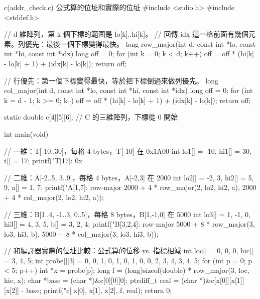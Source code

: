\begin{example}[label=ex:arr-addr]{c}{(addr\_check.c) 公式算的位址和實際的位址}
#include <stdio.h>
#include <stddef.h>

// d 維陣列，第 k 個下標的範圍是 lo[k]..hi[k]。
// 回傳 idx 這一格前面有幾個元素。列優先：最後一個下標變得最快。
long row_major(int d, const int *lo, const int *hi, const int *idx)
{
    long off = 0;
    for (int k = 0; k < d; k++)
        off = off * (hi[k] - lo[k] + 1) + (idx[k] - lo[k]);
    return off;
}

// 行優先：第一個下標變得最快，等於把下標倒過來做列優先。
long col_major(int d, const int *lo, const int *hi, const int *idx)
{
    long off = 0;
    for (int k = d - 1; k >= 0; k--)
        off = off * (hi[k] - lo[k] + 1) + (idx[k] - lo[k]);
    return off;
}

static double c[4][5][6];       // C 的三維陣列，下標從 0 開始

int main(void)
{
    // 一維：T[-10..30]，每格 4 bytes，T[-10] 在 0x1A00
    int lo1[] = {-10}, hi1[] = {30}, t[] = {17};
    printf("T[17]: 0x%

    // 二維：A[-2..5, 3..9]，每格 4 bytes，A[-2,3] 在 2000
    int lo2[] = {-2, 3}, hi2[] = {5, 9}, a[] = {1, 7};
    printf("A[1,7]: row-major %
           2000 + 4 * row_major(2, lo2, hi2, a),
           2000 + 4 * col_major(2, lo2, hi2, a));

    // 三維：B[1..4, -1..3, 0..5]，每格 8 bytes，B[1,-1,0] 在 5000
    int lo3[] = {1, -1, 0}, hi3[] = {4, 3, 5}, b[] = {3, 2, 4};
    printf("B[3,2,4]: row-major %
           5000 + 8 * row_major(3, lo3, hi3, b),
           5000 + 8 * col_major(3, lo3, hi3, b));

    // 和編譯器實際的位址比較：公式算的位移 vs. 指標相減
    int loc[] = {0, 0, 0}, hic[] = {3, 4, 5};
    int probe[][3] = {{0, 0, 1}, {0, 1, 0}, {1, 0, 0},
                      {2, 3, 4}, {3, 4, 5}};
    for (int p = 0; p < 5; p++) {
        int *x = probe[p];
        long f = (long)sizeof(double) * row_major(3, loc, hic, x);
        char *base = (char *)&c[0][0][0];
        ptrdiff_t real = (char *)&c[x[0]][x[1]][x[2]] - base;
        printf("c[%
               x[0], x[1], x[2], f, real);
    }
    return 0;
}
\end{example}

